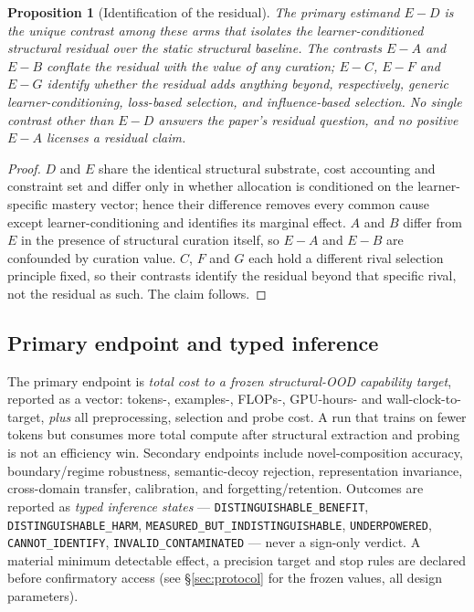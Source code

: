 \documentclass[11pt]{article}
\newtheorem{proposition}{Proposition}
\newcommand{\code}[1]{\texttt{#1}}
\begin{document}
\begin{proposition}[Identification of the residual]
\label{prop:estimand}
The primary estimand $E-D$ is the unique contrast among these arms that isolates the learner-conditioned structural residual over the static structural baseline. The contrasts $E-A$ and $E-B$ conflate the residual with the value of \emph{any} curation; $E-C$, $E-F$ and $E-G$ identify whether the residual adds anything beyond, respectively, generic learner-conditioning, loss-based selection, and influence-based selection. No single contrast other than $E-D$ answers the paper's residual question, and no positive $E-A$ licenses a residual claim.
\end{proposition}
\begin{proof}
$D$ and $E$ share the identical structural substrate, cost accounting and constraint set and differ only in whether allocation is conditioned on the learner-specific mastery vector; hence their difference removes every common cause except learner-conditioning and identifies its marginal effect. $A$ and $B$ differ from $E$ in the presence of structural curation itself, so $E-A$ and $E-B$ are confounded by curation value. $C$, $F$ and $G$ each hold a different rival selection principle fixed, so their contrasts identify the residual beyond that specific rival, not the residual as such. The claim follows.
\end{proof}

\subsection{Primary endpoint and typed inference}
The primary endpoint is \emph{total cost to a frozen structural-OOD capability target}, reported as a vector: tokens-, examples-, FLOPs-, GPU-hours- and wall-clock-to-target, \emph{plus} all preprocessing, selection and probe cost. A run that trains on fewer tokens but consumes more total compute after structural extraction and probing is not an efficiency win. Secondary endpoints include novel-composition accuracy, boundary/regime robustness, semantic-decoy rejection, representation invariance, cross-domain transfer, calibration, and forgetting/retention. Outcomes are reported as \emph{typed inference states} --- \code{DISTINGUISHABLE\_BENEFIT}, \code{DISTINGUISHABLE\_HARM}, \code{MEASURED\_BUT\_INDISTINGUISHABLE}, \code{UNDERPOWERED}, \code{CANNOT\_IDENTIFY}, \code{INVALID\_CONTAMINATED} --- never a sign-only verdict. A material minimum detectable effect, a precision target and stop rules are declared before confirmatory access (see \S\ref{sec:protocol} for the frozen values, all design parameters).
\end{document}
